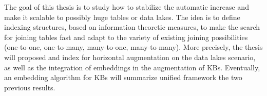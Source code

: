 The goal of this thesis is to study how to stabilize the automatic increase and make it scalable to possibly huge tables or data lakes. The idea is to define indexing structures, based on information theoretic measures, to make the search for joining tables fast and adapt to the variety of existing joining possibilities (one-to-one, one-to-many, many-to-one, many-to-many). More precisely, the thesis will proposed and index for horizontal augmentation on the data lakes scenario, as well as the integration of embeddings in the augmentation of KBs. Eventually, an embedding algorithm for KBs will summarize unified framework the two previous results.




